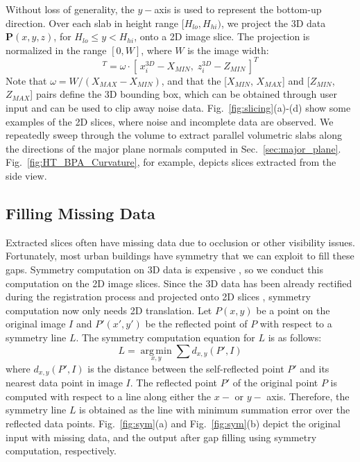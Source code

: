 \documentclass[10pt, conference, compsocconf]{IEEEtran}
\newcommand{\Fig}[1]{Fig.~\ref{fig:#1}}
\newcommand{\Sec}[1]{Sec.~\ref{sec:#1}}
\newcommand{\Figa}[1]{Fig.~\ref{fig:#1}(a)}
\newcommand{\Figb}[1]{Fig.~\ref{fig:#1}(b)}
\begin{document}
Without loss of generality, the $y-$axis is used to represent the bottom-up direction.
Over each slab in height range $[H_{lo}, H_{hi})$,
we project the 3D data $\boldsymbol{P}(x,y,z)$, for $H_{lo} \leq y < H_{hi}$,
onto a 2D image slice.
The projection is normalized in the range $[0,W]$, where $W$ is the image width:
\begin{equation}
[\,x^{2D},\; y^{2D}\,]^T = \omega\cdot[\,x^{3D}_i - X_{MIN},\; z^{3D}_i - Z_{MIN}\,]^T
\label{eq:image_slicing}
\end{equation}
Note that $\omega = W/(X_{MAX} - X_{MIN})$, and that
the [$X_{MIN}$, $X_{MAX}$] and [$Z_{MIN}$, $Z_{MAX}$] pairs define the
3D bounding box, which can be obtained through user input and can be used
to clip away noise data.
\Fig{slicing}(a)-(d) show some examples of the 2D slices, where noise
and incomplete data are observed.
We repeatedly sweep through the volume to extract parallel volumetric slabs
along the directions of the major plane normals computed in \Sec{major_plane}.
\Fig{HT_BPA_Curvature}, for example, depicts slices extracted from the side view.

\subsection{Filling Missing Data}
\label{sec:mdr}

Extracted slices often have missing data due to occlusion or other
visibility issues.
Fortunately, most urban buildings have symmetry that we can exploit to
fill these gaps.
Symmetry computation on 3D data is expensive \cite{Sym_PSGRF},
so we conduct this computation on the 2D image slices.
Since the 3D data has been already rectified during the registration process
and projected onto 2D slices \cite{Stamos08},
symmetry computation now only needs 2D translation.
Let $P(x,y)$ be a point on the original image $I$ and $P'(x',y')$ be the reflected
point of $P$ with respect to a symmetry line $L$.
The symmetry computation equation for $L$ is as follows:
\begin{equation}
L = \underset{x,y}{\operatorname{arg\,min}}\sum{d_{x,y}(P', I)}
\end{equation}
where $d_{x,y}(P',I)$ is the distance between the self-reflected point
$P'$ and its nearest data point in image $I$.
The reflected point $P'$ of the original point $P$ is computed with
respect to a line along either the $x-$ or $y-$ axis.
Therefore, the symmetry line $L$ is obtained as the line with minimum
summation error over the reflected data points.
\Figa{sym} and \Figb{sym} depict the original input with missing data, and
the output after gap filling using symmetry computation, respectively.
\end{document}
